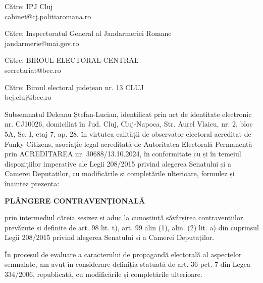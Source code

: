 \documentclass[a4paper,12pt]{article}
\begin{document}
\begin{flushleft}
    \normalsize
    Către: IPJ Cluj\\
    cabinet@cj.politiaromana.ro\\
\end{flushleft}

\begin{flushleft}
    \normalsize
    Către: Inspectoratul General al Jandarmeriei Romane\\
    jandarmerie@mai.gov.ro\\
\end{flushleft}

\begin{flushleft}
    \normalsize
    Către: BIROUL ELECTORAL CENTRAL\\
    secretariat@bec.ro\\
\end{flushleft}

\begin{flushleft}
    \normalsize
    Către: Biroul electoral județean nr. 13 CLUJ\\
    bej.cluj@bec.ro\\
\end{flushleft}

\vspace{1cm}

Subsemnatul Deleanu Ștefan-Lucian, identificat prin act de identitate electronic nr. CJ10026, domiciliat în Jud. Cluj, Cluj-Napoca, Str. Aurel Vlaicu, nr. 2, bloc 5A, Sc. I, etaj 7, ap. 28, în virtutea calității de observator electoral acreditat de Funky Citizens, asociație legal acreditată de Autoritatea Electorală Permanentă prin ACREDITAREA nr. 30688/13.10.2024, în conformitate cu și în temeiul dispozițiilor imperative ale Legii 208/2015 privind alegerea Senatului și a Camerei Deputaților, cu modificările și completările ulterioare, formulez și înaintez prezenta:

\vspace{0.5cm}
\begin{center}
\textbf{\Large PLÂNGERE CONTRAVENȚIONALĂ}
\end{center}
\vspace{0.5cm}

prin intermediul căreia sesizez și aduc la cunoștință săvârșirea contravențiilor prevăzute și definite de art. 98 lit. t), art. 99 alin (1), alin. (2) lit. a) din cuprinsul Legii 208/2015 privind alegerea Senatului și a Camerei Deputaților.

În procesul de evaluare a caracterului de propagandă electorală al aspectelor semnalate, am avut în considerare definiția statuată de art. 36 pct. 7 din Legea 334/2006, republicată, cu modificările și completările ulterioare.
\end{document}
